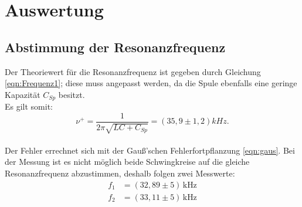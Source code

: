 \newpage
\section{Auswertung}
\label{sec:Auswertung}
\subsection{Abstimmung der Resonanzfrequenz}
Der Theoriewert für die Resonanzfrequenz ist gegeben durch Gleichung \eqref{eqn:Frequenz1};
diese muss angepasst werden, da die Spule ebenfalls eine geringe Kapazität $C_{Sp}$ besitzt.\\
Es gilt somit:\\
\begin{equation}
  \nu^{+}=\frac{1}{2\pi\sqrt{LC+C_{Sp}}}=(35,9\pm 1,2)kHz.
\end{equation}\\
Der Fehler errechnet sich mit der Gauß'schen Fehlerfortpflanzung \eqref{eqn:gaus}.
Bei der Messung ist es nicht möglich beide Schwingkreise auf die gleiche Resonanzfrequenz abzustimmen, deshalb folgen zwei Messwerte:
\begin{align}
f_1&=(32,89\pm5)\,\si{\kilo\hertz}\\
f_2&=(33,11\pm5)\,\si{\kilo\hertz}
\end{align}
